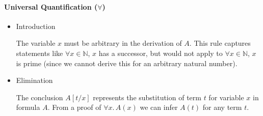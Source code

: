 \paragraph{Universal Quantification ($\forall$)}
\begin{itemize}
    \item Introduction
    \begin{prooftree}
    \end{prooftree}
    The variable $x$ must be arbitrary in the derivation of $A$. 
    This rule captures statements like 
    $\forall x \in \mathbb{N}$, $x$ has a successor, 
    but would not apply to $\forall x \in \mathbb{N}$, $x$ is prime 
    (since we cannot derive this for an arbitrary natural number).
    \item Elimination
    \begin{prooftree}
    \end{prooftree}
    The conclusion $A[t/x]$ represents the substitution of term $t$ for variable $x$ in formula $A$. 
    From a proof of $\forall x.\,A(x)$ we can infer $A(t)$ for any term $t$.
\end{itemize}
